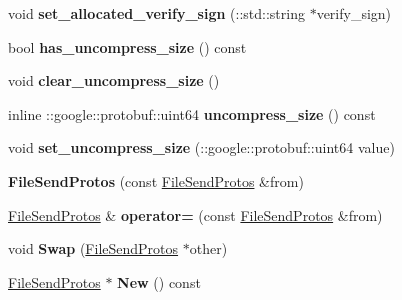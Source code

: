 \begin{DoxyCompactItemize}
void {\bfseries set\+\_\+allocated\+\_\+verify\+\_\+sign} (\+::std\+::string $\ast$verify\+\_\+sign)
\item 
\mbox{\label{classruntime_1_1FileSendProtos_af145d6b6d615fbbc2298d568f7588276}} 
bool {\bfseries has\+\_\+uncompress\+\_\+size} () const
\item 
\mbox{\label{classruntime_1_1FileSendProtos_a4d4c597f88eb52b0ba78d85ad852f3ac}} 
void {\bfseries clear\+\_\+uncompress\+\_\+size} ()
\item 
\mbox{\label{classruntime_1_1FileSendProtos_a134389ccae80779022f9e29f5cb5bbbc}} 
inline \+::google\+::protobuf\+::uint64 {\bfseries uncompress\+\_\+size} () const
\item 
\mbox{\label{classruntime_1_1FileSendProtos_a683d0a4f693b4997c9f59f61ec62fdd2}} 
void {\bfseries set\+\_\+uncompress\+\_\+size} (\+::google\+::protobuf\+::uint64 value)
\item 
\mbox{\label{classruntime_1_1FileSendProtos_a56dd3149794c249c4d7afc2fced634a1}} 
{\bfseries File\+Send\+Protos} (const \hyperlink{classruntime_1_1FileSendProtos}{File\+Send\+Protos} \&from)
\item 
\mbox{\label{classruntime_1_1FileSendProtos_a52a1618f06df7e81c5f3c8b0332abeff}} 
\hyperlink{classruntime_1_1FileSendProtos}{File\+Send\+Protos} \& {\bfseries operator=} (const \hyperlink{classruntime_1_1FileSendProtos}{File\+Send\+Protos} \&from)
\item 
\mbox{\label{classruntime_1_1FileSendProtos_aed7ac6a12ec762db1a8363fc5b351bf4}} 
void {\bfseries Swap} (\hyperlink{classruntime_1_1FileSendProtos}{File\+Send\+Protos} $\ast$other)
\item 
\mbox{\label{classruntime_1_1FileSendProtos_ae5c04b3e5e984bc26f00117d67c36e3b}} 
\hyperlink{classruntime_1_1FileSendProtos}{File\+Send\+Protos} $\ast$ {\bfseries New} () const
\item 
\mbox{\label{classruntime_1_1FileSendProtos_a6779b135aa023d907beeb7c0d761c892}} 

\end{DoxyCompactItemize}
